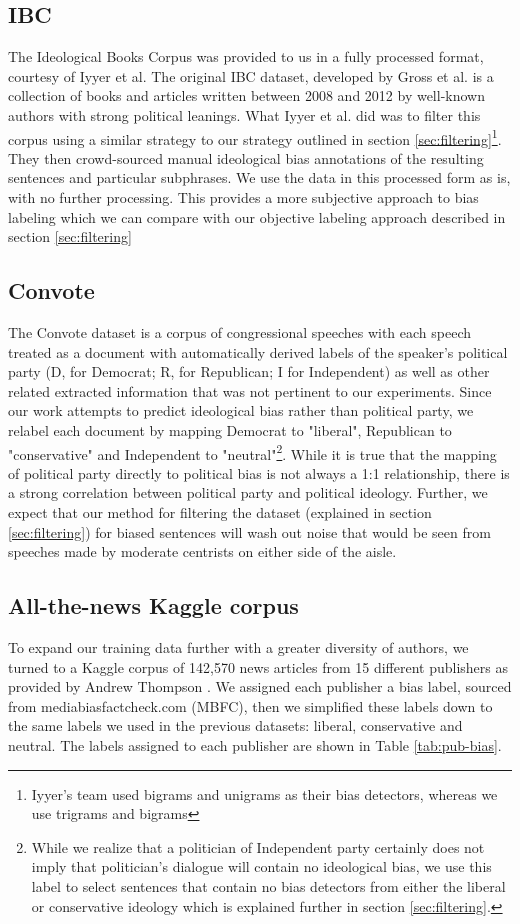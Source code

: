 \documentclass[10pt,a4paper,onecolumn]{article}
\begin{document}
\subsection{IBC}
The Ideological Books Corpus was provided to us in a fully processed format, courtesy of Iyyer et al.\cite{iyyerRNN} The original IBC dataset, developed by Gross et al.\cite{gross2013ibc} is a collection of books and articles written between 2008 and 2012 by well-known authors with strong political leanings. What Iyyer et al. did was to filter this corpus using a similar strategy to our strategy outlined in section \ref{sec:filtering}\footnote{Iyyer's team used bigrams and unigrams as their bias detectors, whereas we use trigrams and bigrams}. They then crowd-sourced manual ideological bias annotations of the resulting sentences and particular subphrases. We use the data in this processed form as is, with no further processing. This provides a more subjective approach to bias labeling which we can compare with our objective labeling approach described in section \ref{sec:filtering}

\subsection{Convote}
The Convote dataset is a corpus of congressional speeches with each speech treated as a document with automatically derived labels of the speaker's political party (D, for Democrat; R, for Republican; I for Independent) as well as other related extracted information that was not pertinent to our experiments. Since our work attempts to predict ideological bias rather than political party, we relabel each document by mapping Democrat to "liberal", Republican to "conservative" and Independent to "neutral"\footnote{While we realize that a politician of Independent party certainly does not imply that politician's dialogue will contain no ideological bias, we use this label to select sentences that contain no bias detectors from either the liberal or conservative ideology which is explained further in section \ref{sec:filtering}.}. While it is true that the mapping of political party directly to political bias is not always a 1:1 relationship, there is a strong correlation between political party and political ideology. Further, we expect that our method for filtering the dataset (explained in section \ref{sec:filtering}) for biased sentences will wash out noise that would be seen from speeches made by moderate centrists on either side of the aisle.

\subsection{All-the-news Kaggle corpus}
To expand our training data further with a greater diversity of authors, we turned to a Kaggle corpus of 142,570 news articles from 15 different publishers as provided by Andrew Thompson \cite{news}. We assigned each publisher a bias label, sourced from mediabiasfactcheck.com (MBFC), then we simplified these labels down to the same labels we used in the previous datasets: liberal, conservative and neutral. The labels assigned to each publisher are shown in Table \ref{tab:pub-bias}.
\end{document}
